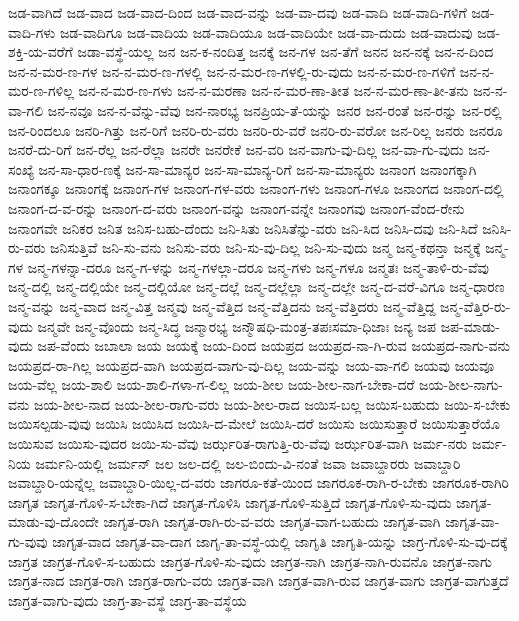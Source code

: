 {ಜಡ-ವಾಗಿದೆ
ಜಡ-ವಾದ
ಜಡ-ವಾದ-ದಿಂದ
ಜಡ-ವಾದ-ವನ್ನು
ಜಡ-ವಾ-ದವು
ಜಡ-ವಾದಿ
ಜಡ-ವಾದಿ-ಗಳಿಗೆ
ಜಡ-ವಾದಿ-ಗಳು
ಜಡ-ವಾದಿಗೂ
ಜಡ-ವಾದಿಯ
ಜಡ-ವಾದಿಯೂ
ಜಡ-ವಾದಿಯೇ
ಜಡ-ವಾ-ದುದು
ಜಡ-ವಾದುವು
ಜಡ-ಶಕ್ತಿ-ಯ-ವರೆಗೆ
ಜಡಾ-ವಸ್ಥೆ-ಯಲ್ಲ
ಜನ
ಜನ-ಕ-ನಂದಿತ್ತ
ಜನಕ್ಕೆ
ಜನ-ಗಳ
ಜನ-ತೆಗೆ
ಜನನ
ಜನ-ನಕ್ಕೆ
ಜನ-ನ-ದಿಂದ
ಜನ-ನ-ಮರ-ಣ-ಗಳ
ಜನ-ನ-ಮರ-ಣ-ಗಳಲ್ಲಿ
ಜನ-ನ-ಮರ-ಣ-ಗಳಲ್ಲಿ-ರು-ವುದು
ಜನ-ನ-ಮರ-ಣ-ಗಳಿಗೆ
ಜನ-ನ-ಮರ-ಣ-ಗಳಿಲ್ಲ
ಜನ-ನ-ಮರ-ಣ-ಗಳು
ಜನ-ನ-ಮರಣಾ
ಜನ-ನ-ಮರ-ಣಾ-ತೀತ
ಜನ-ನ-ಮರ-ಣಾ-ತೀ-ತನು
ಜನ-ನ-ವಾ-ಗಲಿ
ಜನ-ನವೂ
ಜನ-ನ-ವೆನ್ನು-ವೆವು
ಜನ-ನಾರಭ್ಯ
ಜನಪ್ರಿಯ-ತೆ-ಯನ್ನು
ಜನರ
ಜನ-ರಂತೆ
ಜನ-ರನ್ನು
ಜನ-ರಲ್ಲಿ
ಜನ-ರಿಂದಲೂ
ಜನರಿ-ಗಿತ್ತು
ಜನ-ರಿಗೆ
ಜನರಿ-ರು-ವರು
ಜನರಿ-ರು-ವರೆ
ಜನರಿ-ರು-ವರೋ
ಜನ-ರಿಲ್ಲ
ಜನರು
ಜನರೂ
ಜನರೆ-ದು-ರಿಗೆ
ಜನ-ರೆಲ್ಲ
ಜನ-ರೆಲ್ಲಾ
ಜನರೇ
ಜನರೇಕೆ
ಜನ-ವರಿ
ಜನ-ವಾಗು-ವು-ದಿಲ್ಲ
ಜನ-ವಾ-ಗು-ವುದು
ಜನ-ಸಂಖ್ಯೆ
ಜನ-ಸಾ-ಧಾರ-ಣಕ್ಕೆ
ಜನ-ಸಾ-ಮಾನ್ಯರ
ಜನ-ಸಾ-ಮಾನ್ಯ-ರಿಗೆ
ಜನ-ಸಾ-ಮಾನ್ಯರು
ಜನಾಂಗ
ಜನಾಂಗಕ್ಕಾಗಿ
ಜನಾಂಗಕ್ಕೂ
ಜನಾಂಗಕ್ಕೆ
ಜನಾಂಗ-ಗಳ
ಜನಾಂಗ-ಗಳ-ವರು
ಜನಾಂಗ-ಗಳು
ಜನಾಂಗ-ಗಳೂ
ಜನಾಂಗದ
ಜನಾಂಗ-ದಲ್ಲಿ
ಜನಾಂಗ-ದ-ವ-ರನ್ನು
ಜನಾಂಗ-ದ-ವರು
ಜನಾಂಗ-ವನ್ನು
ಜನಾಂಗ-ವನ್ನೇ
ಜನಾಂಗವು
ಜನಾಂಗ-ವೆಂದ-ರೇನು
ಜನಾಂಗವೇ
ಜನಿಕರ
ಜನಿತ
ಜನಿಸ-ಬಹು-ದೆಂದು
ಜನಿ-ಸಿತು
ಜನಿಸಿತೆನ್ನು-ವರು
ಜನಿ-ಸಿದ
ಜನಿಸಿ-ದವು
ಜನಿ-ಸಿದೆ
ಜನಿಸಿ-ರು-ವರು
ಜನಿಸುತ್ತಿವೆ
ಜನಿ-ಸು-ವನು
ಜನಿಸು-ವರು
ಜನಿ-ಸು-ವು-ದಿಲ್ಲ
ಜನಿ-ಸು-ವುದು
ಜನ್ಮ
ಜನ್ಮ-ಕಥನ್ತಾ
ಜನ್ಮಕ್ಕೆ
ಜನ್ಮ-ಗಳ
ಜನ್ಮ-ಗಳನ್ನಾ-ದರೂ
ಜನ್ಮ-ಗ-ಳನ್ನು
ಜನ್ಮ-ಗಳಲ್ಲಾ-ದರೂ
ಜನ್ಮ-ಗಳು
ಜನ್ಮ-ಗಳೂ
ಜನ್ಮತಃ
ಜನ್ಮ-ತಾಳಿ-ರು-ವೆವು
ಜನ್ಮ-ದಲ್ಲಿ
ಜನ್ಮ-ದಲ್ಲಿಯೇ
ಜನ್ಮ-ದಲ್ಲಿಯೋ
ಜನ್ಮ-ದಲ್ಲೆ
ಜನ್ಮ-ದಲ್ಲೆಲ್ಲಾ
ಜನ್ಮ-ದಲ್ಲೇ
ಜನ್ಮ-ದ-ವರೆ-ವಿಗೂ
ಜನ್ಮ-ಧಾರಣ
ಜನ್ಮ-ವನ್ನು
ಜನ್ಮ-ವಾದ
ಜನ್ಮ-ವಿತ್ತ
ಜನ್ಮವು
ಜನ್ಮ-ವೆತ್ತಿದ
ಜನ್ಮ-ವೆತ್ತಿದನು
ಜನ್ಮ-ವೆತ್ತಿದರು
ಜನ್ಮ-ವೆತ್ತಿದ್ದ
ಜನ್ಮ-ವೆತ್ತಿರ-ರು-ವುದು
ಜನ್ಮವೇ
ಜನ್ಮ-ವೊಂದು
ಜನ್ಮ-ಸಿದ್ಧ
ಜನ್ಮಾರಭ್ಯ
ಜನ್ಮೌಷಧಿ-ಮಂತ್ರ-ತಪಃಸಮಾ-ಧಿಜಾಃ
ಜನ್ಯ
ಜಪ
ಜಪ-ಮಾಡು-ವುದು
ಜಪ-ವೆಂದು
ಜಬಾಲಾ
ಜಯ
ಜಯಕ್ಕೆ
ಜಯ-ದಿಂದ
ಜಯಪ್ರದ
ಜಯಪ್ರದ-ನಾ-ಗಿ-ರುವ
ಜಯಪ್ರದ-ನಾಗು-ವನು
ಜಯಪ್ರದ-ರಾ-ಗಿಲ್ಲ
ಜಯಪ್ರದ-ವಾಗಿ
ಜಯಪ್ರದ-ವಾಗು-ವು-ದಿಲ್ಲ
ಜಯ-ವನ್ನು
ಜಯ-ವಾ-ಗಲಿ
ಜಯವು
ಜಯವೂ
ಜಯ-ವೆಲ್ಲ
ಜಯ-ಶಾಲಿ
ಜಯ-ಶಾಲಿ-ಗಳಾ-ಗ-ಲಿಲ್ಲ
ಜಯ-ಶೀಲ
ಜಯ-ಶೀಲ-ನಾಗ-ಬೇಕಾ-ದರೆ
ಜಯ-ಶೀಲ-ನಾಗು-ವನು
ಜಯ-ಶೀಲ-ನಾದ
ಜಯ-ಶೀಲ-ರಾಗು-ವರು
ಜಯ-ಶೀಲ-ರಾದ
ಜಯಿಸ-ಬಲ್ಲ
ಜಯಿಸ-ಬಹುದು
ಜಯಿ-ಸ-ಬೇಕು
ಜಯಿಸಲ್ಪಡು-ವುವು
ಜಯಿಸಿ
ಜಯಿಸಿದ
ಜಯಿಸಿ-ದ-ಮೇಲೆ
ಜಯಿಸಿ-ದರೆ
ಜಯಿಸು
ಜಯಿಸುತ್ತಾರೆ
ಜಯಿಸುತ್ತಾರೆಯೊ
ಜಯಿಸುವ
ಜಯಿಸು-ವುದರ
ಜಯಿ-ಸು-ವೆವು
ಜರ್ಝರಿತ-ರಾಗುತ್ತಿ-ರು-ವೆವು
ಜರ್ಝರಿತ-ವಾಗಿ
ಜರ್ಮ-ನರು
ಜರ್ಮ-ನಿಯ
ಜರ್ಮನಿ-ಯಲ್ಲಿ
ಜರ್ಮನ್
ಜಲ
ಜಲ-ದಲ್ಲಿ
ಜಲ-ಬಿಂದು-ವಿ-ನಂತೆ
ಜವಾ
ಜವಾಬ್ದಾರರು
ಜವಾಬ್ದಾರಿ
ಜವಾಬ್ದಾರಿ-ಯನ್ನೆಲ್ಲ
ಜವಾಬ್ದಾರಿ-ಯಿಲ್ಲ-ದ-ವರು
ಜಾಗರೂ-ಕತೆ-ಯಿಂದ
ಜಾಗರೂಕ-ರಾಗಿ-ರ-ಬೇಕು
ಜಾಗರೂಕ-ರಾಗಿರಿ
ಜಾಗೃತ
ಜಾಗೃತ-ಗೊಳಿ-ಸ-ಬೇಕಾ-ಗಿದೆ
ಜಾಗೃತ-ಗೊಳಿಸಿ
ಜಾಗೃತ-ಗೊಳಿ-ಸುತ್ತಿದೆ
ಜಾಗೃತ-ಗೊಳಿ-ಸು-ವುದು
ಜಾಗೃತ-ಮಾಡು-ವು-ದೊಂದೇ
ಜಾಗೃತ-ರಾಗಿ
ಜಾಗೃತ-ರಾಗಿ-ರು-ವ-ವರು
ಜಾಗೃತ-ವಾಗ-ಬಹುದು
ಜಾಗೃತ-ವಾಗಿ
ಜಾಗೃತ-ವಾ-ಗು-ವುವು
ಜಾಗೃತ-ವಾದ
ಜಾಗೃತ-ವಾ-ದಾಗ
ಜಾಗೃ-ತಾ-ವಸ್ಥೆ-ಯಲ್ಲಿ
ಜಾಗೃತಿ
ಜಾಗೃತಿ-ಯನ್ನು
ಜಾಗ್ರ-ಗೊಳಿ-ಸು-ವು-ದಕ್ಕೆ
ಜಾಗ್ರತ
ಜಾಗ್ರತ-ಗೊಳಿ-ಸ-ಬಹುದು
ಜಾಗ್ರತ-ಗೊಳಿ-ಸು-ವುದು
ಜಾಗ್ರತ-ನಾಗಿ
ಜಾಗ್ರತ-ನಾಗಿ-ರುವನೊ
ಜಾಗ್ರತ-ನಾಗು
ಜಾಗ್ರತ-ನಾದ
ಜಾಗ್ರತ-ರಾಗಿ
ಜಾಗ್ರತ-ರಾಗು-ವರು
ಜಾಗ್ರತ-ವಾಗಿ
ಜಾಗ್ರತ-ವಾಗಿ-ರುವ
ಜಾಗ್ರತ-ವಾಗು
ಜಾಗ್ರತ-ವಾಗುತ್ತದೆ
ಜಾಗ್ರತ-ವಾಗು-ವುದು
ಜಾಗ್ರ-ತಾ-ವಸ್ಥೆ
ಜಾಗ್ರ-ತಾ-ವಸ್ಥೆಯ
}
